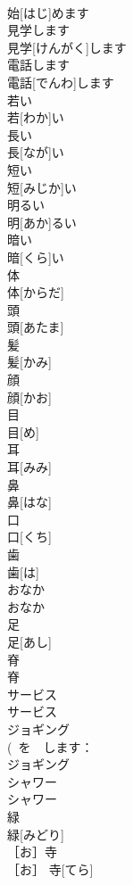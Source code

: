 \documentclass[8pt]{extreport}
\begin{document}
\begin{CJK}{UTF8}{min}
\\	始[はじ]めます	
\\	見学します	
\\	見学[けんがく]します	
\\	電話します	
\\	電話[でんわ]します	
\\	若い	
\\	若[わか]い	
\\	長い	
\\	長[なが]い	
\\	短い	
\\	短[みじか]い	
\\	明るい	
\\	明[あか]るい	
\\	暗い	
\\	暗[くら]い	
\\	体	
\\	体[からだ]	
\\	頭	
\\	頭[あたま]	
\\	髪	
\\	髪[かみ]	
\\	顔	
\\	顔[かお]	
\\	目	
\\	目[め]	
\\	耳	
\\	耳[みみ]	
\\	鼻	
\\	鼻[はな]	
\\	口	
\\	口[くち]	
\\	歯	
\\	歯[は]	
\\	おなか	
\\	おなか	
\\	足	
\\	足[あし]	
\\	脊	
\\	脊	
\\	サービス	
\\	サービス	
\\	ジョギング	
\\	(~を　します：
\\	ジョギング	
\\	シャワー	
\\	シャワー	
\\	緑	
\\	緑[みどり]	
\\	［お］寺	
\\	［お］ 寺[てら]	

\end{CJK}
\end{document}
